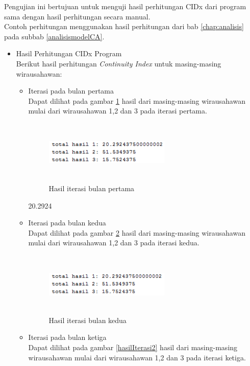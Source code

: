 Pengujian ini bertujuan untuk menguji hasil perhitungan CIDx dari program sama dengan hasil perhitungan secara manual.\\
Contoh perhitungan menggunakan hasil perhitungan dari bab \ref{chap:analisis} pada subbab \ref{analisismodelCA}.
\begin{itemize}
\item Hasil Perhitungan CIDx Program\\
	Berikut hasil perhitungan \textit{Continuity Index} untuk masing-masing wirausahawan:
	\begin{itemize}
		\item Iterasi pada bulan pertama\\
		Dapat dilihat pada gambar \ref{hasilIterasi0} hasil dari masing-masing wirausahawan mulai dari wirausahawan 1,2 dan 3 pada iterasi pertama.
	\begin{figure} [H]
	\centering  
	\includegraphics[width=6cm, height=3cm]{hasilIterasi0} 
		\caption[Hasil Iterasi bulan pertama]{Hasil iterasi bulan pertama}
	\label{hasilIterasi0} 
\end{figure}
	 20.2924
		\item Iterasi pada bulan kedua\\
		Dapat dilihat pada gambar \ref{hasilIterasi1} hasil dari masing-masing wirausahawan mulai dari wirausahawan 1,2 dan 3 pada iterasi kedua.
	\begin{figure} [H]
	\centering  
	\includegraphics[width=6cm, height=3cm]{hasilIterasi1} 
		\caption[Hasil Iterasi bulan kedua]{Hasil iterasi bulan kedua}
	\label{hasilIterasi1} 
\end{figure}
		\item Iterasi pada bulan ketiga\\
		Dapat dilihat pada gambar \ref{hasilIterasi2} hasil dari masing-masing wirausahawan mulai dari wirausahawan 1,2 dan 3 pada iterasi ketiga.
		

\end{itemize}
\end{itemize}
